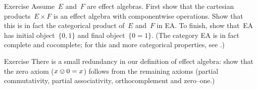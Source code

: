 \documentclass[b]{subfiles}
\begin{document}
\begin{parsec}
\begin{point}[ea-product]{Exercise}%
Assume~$E$ and~$F$ are effect algebras.
First show that the cartesian products~$E \times F$
    is an effect algebra with componentwise operations.
Show that this is in fact the categorical product of~$E$ and~$F$
    in \textsf{EA}.
To finish, show that~\textsf{EA} has initial
    object~$\{0,1\}$
    and final object~$\{0=1\}$.
(The category \textsf{EA} is in fact complete and cocomplete;
    for this and more categorical properties,
        see \cite{corefl}.)
\end{point}

\begin{point}{Exercise}%
There is a small redundancy in our definition of effect algebra:
show that the zero axiom ($x \ovee 0 = x$)
follows from the remaining axioms (partial commutativity,
partial associativity, orthocomplement and zero--one.)
\end{point}


\end{parsec}
\end{document}
